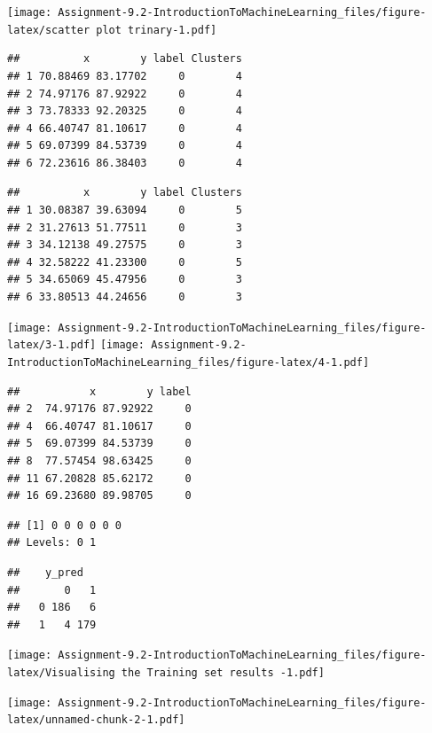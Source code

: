 \documentclass[
]{article}
\begin{document}
\texttt{[image: Assignment-9.2-IntroductionToMachineLearning\_files/figure-latex/scatter plot trinary-1.pdf]}

\begin{verbatim}
##          x        y label Clusters
## 1 70.88469 83.17702     0        4
## 2 74.97176 87.92922     0        4
## 3 73.78333 92.20325     0        4
## 4 66.40747 81.10617     0        4
## 5 69.07399 84.53739     0        4
## 6 72.23616 86.38403     0        4
\end{verbatim}

\begin{verbatim}
##          x        y label Clusters
## 1 30.08387 39.63094     0        5
## 2 31.27613 51.77511     0        3
## 3 34.12138 49.27575     0        3
## 4 32.58222 41.23300     0        5
## 5 34.65069 45.47956     0        3
## 6 33.80513 44.24656     0        3
\end{verbatim}

\texttt{[image: Assignment-9.2-IntroductionToMachineLearning\_files/figure-latex/3-1.pdf]}
\texttt{[image: Assignment-9.2-IntroductionToMachineLearning\_files/figure-latex/4-1.pdf]}

\begin{verbatim}
##           x        y label
## 2  74.97176 87.92922     0
## 4  66.40747 81.10617     0
## 5  69.07399 84.53739     0
## 8  77.57454 98.63425     0
## 11 67.20828 85.62172     0
## 16 69.23680 89.98705     0
\end{verbatim}

\begin{verbatim}
## [1] 0 0 0 0 0 0
## Levels: 0 1
\end{verbatim}

\begin{verbatim}
##    y_pred
##       0   1
##   0 186   6
##   1   4 179
\end{verbatim}

\texttt{[image: Assignment-9.2-IntroductionToMachineLearning\_files/figure-latex/Visualising the Training set results -1.pdf]}

\texttt{[image: Assignment-9.2-IntroductionToMachineLearning\_files/figure-latex/unnamed-chunk-2-1.pdf]}
\end{document}
